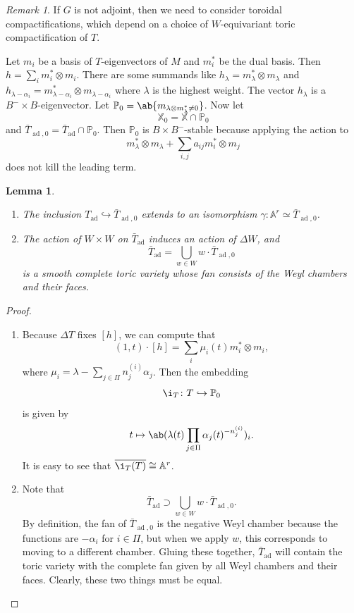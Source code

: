 \documentclass{amsart}
\newtheorem{lem}[thm]{Lemma}
\theoremstyle{definition}
\theoremstyle{remark}
\newtheorem{rmk}[thm]{Remark}
\theoremstyle{plain}
\theoremstyle{definition}
\theoremstyle{remark}
\newcommand{\A}{\mathbb{A}}
\renewcommand{\P}{\mathbb{P}}
\newcommand{\mbb}[1]{\mathbb{#1}}
\newcommand{\on}[1]{\operatorname{#1}}
\newcommand{\ol}[1]{\overline{#1}}
\newcommand{\1}{\mathbf{1}}
\newcommand{\2}{\mathbf{2}}
\newcommand{\3}{\mathbf{3}}
\DeclareMathOperator{\ad}{ad}
\begin{document}
\begin{rmk}
    If \(G\) is not adjoint, then we need to consider toroidal compactifications, which depend on a choice of \(W\)-equivariant toric compactification of \(T\).
\end{rmk}

Let \(m_i\) be a basis of \(T\)-eigenvectors of \(M\) and \(m_i^*\) be the dual basis. Then \(h = \sum_i m_i^* \otimes m_i\). There are some summands like \(h_{\lambda} = m_{\lambda}^* \otimes m_{\lambda}\) and \(h_{\lambda - \alpha_i} = m_{\lambda-\alpha_i}^* \otimes m_{\lambda - \alpha_i}\) where \(\lambda\) is the highest weight. The vector \(h_{\lambda}\) is a \(B^- \times B\)-eigenvector. Let \(\P_0 = \ab\{ m_{\lambda \otimes m_{\lambda}^* \neq 0}\}\). Now let
\[ \mbb{X}_0 = \mbb{X} \cap \P_0 \]
and \(\bar{T}_{\ad, 0} = \bar{T}_{\ad} \cap \P_0\). Then \(\P_0\) is \(B \times B^-\)-stable because applying the action to 
\[ m_{\lambda}^* \otimes m_{\lambda} + \sum_{i,j} a_{ij} m_i^* \otimes m_j \]
does not kill the leading term.

\begin{lem}\leavevmode
    \begin{enumerate}
        \item The inclusion \(T_{\on{ad}} \hookrightarrow \bar{T}_{\ad, 0}\) extends to an isomorphism \(\gamma \colon \A^r \simeq \bar{T}_{\ad, 0}\). 
        \item The action of \(W \times W\) on \(\bar{T}_{\ad}\) induces an action of \(\Delta W\), and
        \[ \bar{T}_{\ad} = \bigcup_{w \in W} w \cdot \bar{T}_{\ad, 0} \]
        is a smooth complete toric variety whose fan consists of the Weyl chambers and their faces. 
    \end{enumerate}
\end{lem}

\begin{proof}\leavevmode
    \begin{enumerate}
        \item Because \(\Delta T\) fixes \([h]\), we can compute that
        \[ (1, t) \cdot [h] = \sum_i \mu_i(t) m_i^* \otimes m_i, \]
        where \(\mu_i = \lambda - \sum_{j \in \Pi} n_j^{(i)} \alpha_j\). Then the embedding
        \[ \i_T \colon T \hookrightarrow \P_0\] is given by
        \[ t \mapsto \ab(\lambda(t) \prod_{j \in \Pi} \alpha_j(t)^{-n_j^{(i)}})_i. \]
        It is easy to see that \(\ol{\i_T(T)} \cong \A^r\).
        \item Note that 
        \[ \bar{T}_{\ad} \supset \bigcup_{w \in W} w \cdot \bar{T}_{\ad, 0}. \]
        By definition, the fan of \(\bar{T}_{\ad, 0}\) is the negative Weyl chamber because the functions are \(-\alpha_i\) for \(i \in \Pi\), but when we apply \(w\), this corresponds to moving to a different chamber. Gluing these together, \(\bar{T}_{\ad}\) will contain the toric variety with the complete fan given by all Weyl chambers and their faces. Clearly, these two things must be equal. \qedhere
    \end{enumerate}
\end{proof}
\end{document}
